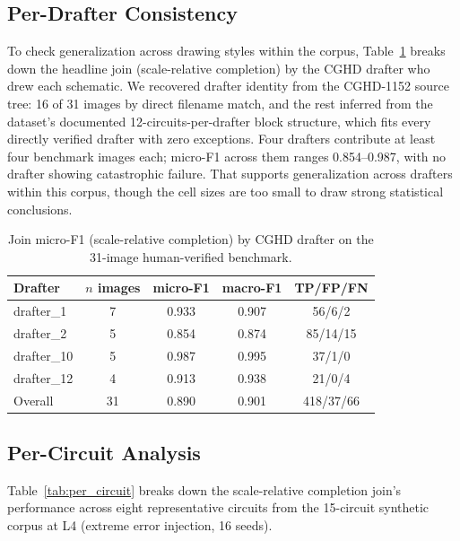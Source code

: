 \documentclass{ieeeaccess}
\begin{document}
\subsection{Per-Drafter Consistency}
To check generalization across drawing styles within the corpus, Table~\ref{tab:per_drafter} breaks down the headline join (scale-relative completion) by the CGHD drafter who drew each schematic. We recovered drafter identity from the CGHD-1152 source tree: 16 of 31 images by direct filename match, and the rest inferred from the dataset's documented 12-circuits-per-drafter block structure, which fits every directly verified drafter with zero exceptions. Four drafters contribute at least four benchmark images each; micro-F1 across them ranges 0.854--0.987, with no drafter showing catastrophic failure. That supports generalization across drafters within this corpus, though the cell sizes are too small to draw strong statistical conclusions.

\begin{table}[htbp]
\caption{Join micro-F1 (scale-relative completion) by CGHD drafter on the 31-image human-verified benchmark.}
\label{tab:per_drafter}
\centering
\begin{tabular}{lcccc}
\hline
Drafter & $n$ images & micro-F1 & macro-F1 & TP/FP/FN \\
\hline
drafter\_1  & 7 & 0.933 & 0.907 & 56/6/2 \\
drafter\_2  & 5 & 0.854 & 0.874 & 85/14/15 \\
drafter\_10 & 5 & 0.987 & 0.995 & 37/1/0 \\
drafter\_12 & 4 & 0.913 & 0.938 & 21/0/4 \\
\hline
Overall    & 31 & 0.890 & 0.901 & 418/37/66 \\
\hline
\end{tabular}
\end{table}

\subsection{Per-Circuit Analysis}

Table~\ref{tab:per_circuit} breaks down the scale-relative completion join's performance across eight representative circuits from the 15-circuit synthetic corpus at L4 (extreme error injection, 16 seeds).
\end{document}
